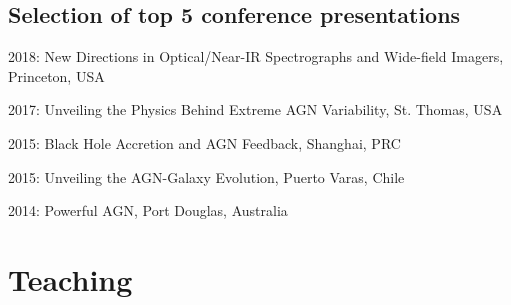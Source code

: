 \documentclass[11pt,letterpaper]{article}
\renewenvironment{itemize}{
  \begin{list}{}{
    \setlength{\leftmargin}{1.5em}
    \setlength{\itemsep}{0.10em}
    \setlength{\parskip}{0pt}
    \setlength{\parsep}{0.10em}
  }
}{
  \end{list}
}
\begin{document}
\subsection*{Selection of top 5  conference presentations}
\begin{itemize}
\item 2018:  New Directions in Optical/Near-IR Spectrographs and Wide-field Imagers, Princeton, USA 
\item 2017: Unveiling the Physics Behind Extreme AGN Variability, St. Thomas, USA 

\item 2015:
Black Hole Accretion and AGN Feedback, Shanghai, PRC
\item 2015: Unveiling the AGN-Galaxy Evolution, Puerto Varas, Chile 
\item 2014:
 Powerful AGN, Port Douglas, Australia 
\end{itemize}

\section*{Teaching}
\end{document}
